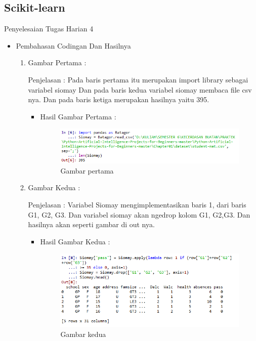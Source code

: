 \subsection{Scikit-learn}
Penyelesaian Tugas Harian 4 
\begin{itemize}
\item Pembahasan Codingan Dan Hasilnya
\begin{enumerate}
\item Gambar Pertama :
\par Penjelasan : Pada baris pertama itu merupakan import library sebagai variabel siomay  Dan pada baris kedua variabel siomay membaca file csv nya. Dan pada baris ketiga merupakan hasilnya yaitu 395.

\par
\begin{itemize}
\par
\item Hasil  Gambar Pertama :
\par

\begin{figure}[!hbtp]
\centering
\includegraphics[scale=0.6]{figures/AIP/jd1.PNG}
\caption{ Gambar pertama}
\label{1}
\end{figure}

\par
\end{itemize}
\item  Gambar Kedua :
\par Penjelasan : Variabel Siomay mengimplementasikan baris 1, dari baris G1, G2, G3. Dan variabel siomay akan ngedrop kolom G1, G2,G3. Dan hasilnya akan seperti gambar di out nya.
\par 
\begin{itemize}
\par
\item Hasil Gambar Kedua :

\begin{figure}[!hbtp]
\centering
\includegraphics[scale=0.7]{figures/AIP/jd2.PNG}
\caption{Gambar kedua}
\label{2}
\end{figure}


\end{itemize}
\end{enumerate}
\end{itemize}
